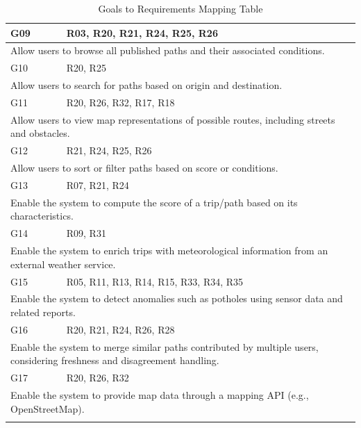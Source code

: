 \begin{longtable}{|l|p{}|}
    G09 & R03, R20, R21, R24, R25, R26 \\
    \hline
    \multicolumn{2}{|p{0.8\textwidth}|}{Allow users to browse all published paths and their associated conditions.} \\
    \hline \hline

    G10 & R20, R25 \\
    \hline
    \multicolumn{2}{|p{0.8\textwidth}|}{Allow users to search for paths based on origin and destination.} \\
    \hline \hline

    G11 & R20, R26, R32, R17, R18 \\
    \hline
    \multicolumn{2}{|p{0.8\textwidth}|}{Allow users to view map representations of possible routes, including streets and obstacles.} \\
    \hline \hline

    G12 & R21, R24, R25, R26 \\
    \hline
    \multicolumn{2}{|p{0.8\textwidth}|}{Allow users to sort or filter paths based on score or conditions.} \\
    \hline \hline

    G13 & R07, R21, R24 \\
    \hline
    \multicolumn{2}{|p{0.8\textwidth}|}{Enable the system to compute the score of a trip/path based on its characteristics.} \\
    \hline \hline

    G14 & R09, R31 \\
    \hline
    \multicolumn{2}{|p{0.8\textwidth}|}{Enable the system to enrich trips with meteorological information from an external weather service.} \\
    \hline \hline

    G15 & R05, R11, R13, R14, R15, R33, R34, R35 \\
    \hline
    \multicolumn{2}{|p{0.8\textwidth}|}{Enable the system to detect anomalies such as potholes using sensor data and related reports.} \\
    \hline \hline

    G16 & R20, R21, R24, R26, R28 \\
    \hline
    \multicolumn{2}{|p{0.8\textwidth}|}{Enable the system to merge similar paths contributed by multiple users, considering freshness and disagreement handling.} \\
    \hline \hline

    G17 & R20, R26, R32 \\
    \hline
    \multicolumn{2}{|p{0.8\textwidth}|}{Enable the system to provide map data through a mapping API (e.g., OpenStreetMap).} \\
    \hline

    \caption{Goals to Requirements Mapping Table}
    \label{tab:goals-requirements-mapping}
\end{longtable}

